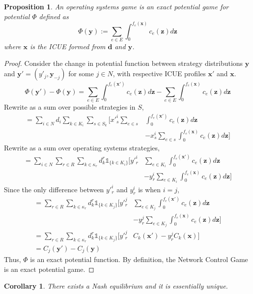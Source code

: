 \documentclass{article}
\newtheorem{prop}{Proposition}
\newtheorem{cor}{Corollary}
\begin{document}
   \begin{prop}
    An operating systems game is an exact potential game for potential $\Phi$ defined as 
    \[ \Phi(\bm{y}) := \sum_{e \in E} \int_0^{f_e(\bm{x})} c_e(\bm{z})d\bm{z} \]
    where $\bm{x}$ is the ICUE formed from $\bm{d}$ and $\bm{y}$.
   \end{prop}
    	\begin{proof}
		Consider the change in potential function between strategy distributions $\bm{y}$ and $\bm{y}'=(y'_j, \bm{y}_{-j})$ for some $j \in N$, with respective ICUE profiles $\bm{x}'$ and $\bm{x}$.
		\[
		\Phi(\bm{y}') - \Phi(\bm{y}) = \sum_{e \in E} \int_0^{f_e(\bm{x}')} c_e(\bm{z})d \bm{z} - \sum_{e \in E}  \int_0^{f_e(\bm{x})} c_e(\bm{z})d \bm{z} \] 
		Rewrite as a sum over possible strategies in $S$,   
		 \begin{align*} 
		 = \sum_{i \in N} d_i  \sum_{k \in K_i} \sum_{s \in S_k} \Big[ x'^i_s \sum_{e \in s} & \int_0^{f_e(\bm{x}')} c_e(\bm{z})d\bm{z}  \\ 
		 & - x^i_s  \sum_{e \in s}  \int_0^{f_e(\bm{x})} c_e(\bm{z})d\bm{z} \Big] 
		 \end{align*}
		Rewrite as a sum over operating systems strategies, 
		\begin{align*}
		   = \sum_{i \in N} \sum_{r \in R}  \sum_{k \in \kappa_r} d^r_k \mathds{1}_{ \{k \in K_i \} }  \Big[ y'^i_r & \sum_{e \in K_i}  \int_0^{f_e(\bm{x}')} c_e(\bm{z})d\bm{z} \\
		   &- y^i_r \sum_{e \in K_i}  \int_0^{f_e(\bm{x})} c_e(\bm{z})d\bm{z} \Big] \end{align*}
	    Since the only difference between  $y'^i_r$ and $y^i_r$ is when $i = j$,
	    \begin{align*}
		= \sum_{r \in R}  \sum_{k \in \kappa_r} d^r_k \mathds{1}_{ \{k \in K_j \} } \Big[ y'^j_r & \sum_{e \in K_j}  \int_0^{f_e(\bm{x}')} c_e(\bm{z})d\bm{z}  \\
		&- y^j_r \sum_{e \in K_j}  \int_0^{f_e(\bm{x})} c_e(\bm{z})d\bm{z} \Big] \\ 
		= \sum_{r \in R}  \sum_{k \in \kappa_r} d^r_k \mathds{1}_{ \{k \in K_j \} } \Big[ y'^j_r & C_k(\bm{x}') - y^j_r C_k(\bm{x}) \Big] \\
		 = C_j(\bm{y}') - C_j(\bm{y}) \,\,\,\,\,\,\,\,\,\,\,\,\,\,\,\,\,\,\,\, &
		\end{align*} 
		Thus, $\Phi$ is an exact potential function. By definition, the Network Control Game is an exact potential game.
	\end{proof}
   \begin{cor} \label{cor:os}
    There exists a Nash equilibrium and it is essentially unique. 
    \end{cor}
    
\end{document}
